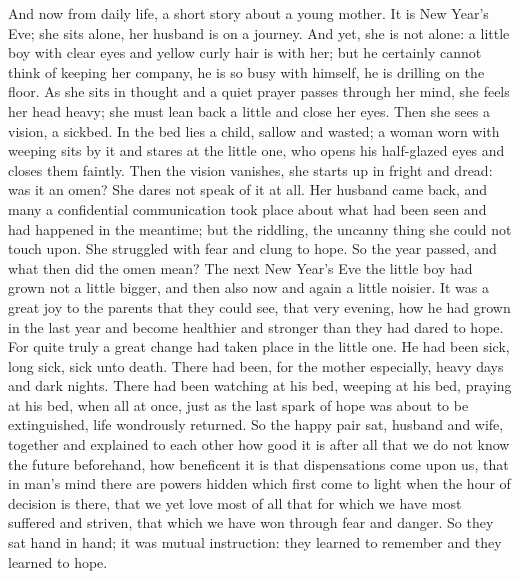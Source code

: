 \documentclass[12pt,a4paper,openany]{book}
\newcommand{\opage}[1]{\marginnote{\footnotesize\textit{[#1]}}}
\begin{document}
And now from daily life, a short story about a young mother. It is New Year's Eve; she sits alone,
her husband is on a journey. And yet, she is not alone: a little boy with clear eyes and yellow
curly hair is with her; but he certainly cannot think of keeping her company, he is so busy with
himself, he is drilling on the floor. As she sits in
\setcounter{footnote}{0}%
\opage{8}thought and a quiet prayer passes through her mind, she feels her head heavy; she must lean
back a little and close her eyes. Then she sees a vision, a sickbed. In the bed lies a child, sallow
and wasted; a woman worn with weeping sits by it and stares at the little one, who opens his
half-glazed eyes and closes them faintly. Then the vision vanishes, she starts up in fright and
dread: was it an omen? She dares not speak of it at all. Her husband came back, and many a
confidential communication took place about what had been seen and had happened in the meantime;
but the riddling, the uncanny thing she could not touch upon. She struggled with fear and clung to
hope. So the year passed, and what then did the omen mean? The next New Year's Eve the little boy
had grown not a little bigger, and then also now and again a little noisier. It was a great joy to
the parents that they could see, that very evening, how he had grown in the last year and become
healthier and stronger than they had dared to hope. For quite truly a great change had taken place
in the little one. He had been sick, long sick, sick unto death. There had been, for the mother
especially, heavy days and dark nights. There had been watching at his bed, weeping at his bed,
praying at his bed, when all at once, just as the last spark of hope was about to be extinguished,
life wondrously returned. So the happy pair sat, husband and wife, together and explained to each
other how good it is after all that we do not know the future beforehand, how beneficent it is that
dispensations come upon us, that in man's mind there are powers hidden which first come to light
when the hour of decision is there, that we yet love most of all that for which we have most
suffered and striven, that which
\setcounter{footnote}{0}%
\opage{9}we have won through fear and danger. So they sat hand in hand; it was mutual instruction:
they learned to remember and they learned to hope.
\end{document}
